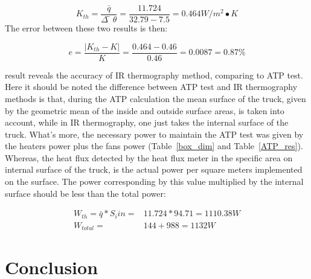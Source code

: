\documentclass{tQRT2e}
\begin{document}
\begin{equation*}
K_{th}=\frac{\bar{q}}{\Delta ̅\theta} =\frac{11.724}{32.79-7.5}=0.464 W/m^2∙K 
\end{equation*}
The error between these two results is then:

\begin{equation*}
e=  \frac{|K_{th}-K|}{K}=\frac{0.464-0.46}{0.46}=0.0087=0.87\%
\end{equation*}

result reveals the accuracy of IR thermography method, comparing to ATP test. Here it should be noted the difference between ATP test and IR thermography methods is that, during the ATP calculation the mean surface of the truck, given by the geometric mean of the inside and outside surface areas, is taken into account, while in IR thermography, one just takes the internal surface of the truck. What’s more, the necessary power to maintain the ATP test was given by the heaters power plus the fans power (Table~\ref{box_dim} and Table~\ref{ATP_res}). Whereas, the heat flux detected by the heat flux meter in the specific area on internal surface of the truck, is the actual power per square meters implemented on the surface. The power corresponding by this value multiplied by the internal surface should be less than the total power:

\begin{align*}
W_{th}= \bar{q}*S_i{in}=&11.724*94.71=1110.38 W \\
W_{total}= &144 + 988 = 1132 W
\end{align*}


\section{Conclusion}
\end{document}

